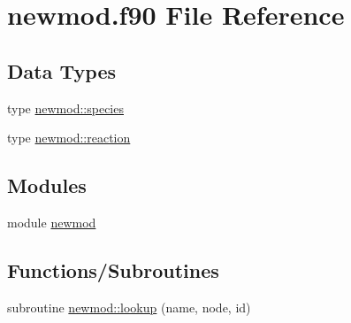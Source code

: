 \hypertarget{newmod_8f90}{
\section{newmod.f90 File Reference}
\label{newmod_8f90}
}
\subsection*{Data Types}
\begin{DoxyCompactItemize}
\item 
type \hyperlink{typenewmod_1_1species}{newmod::species}
\item 
type \hyperlink{typenewmod_1_1reaction}{newmod::reaction}
\end{DoxyCompactItemize}
\subsection*{Modules}
\begin{DoxyCompactItemize}
\item 
module \hyperlink{namespacenewmod}{newmod}
\end{DoxyCompactItemize}
\subsection*{Functions/Subroutines}
\begin{DoxyCompactItemize}
\item 
subroutine \hyperlink{namespacenewmod_a6e08d1c91ffcb8d044e3ad8d8b535348}{newmod::lookup} (name, node, id)
\end{DoxyCompactItemize}

